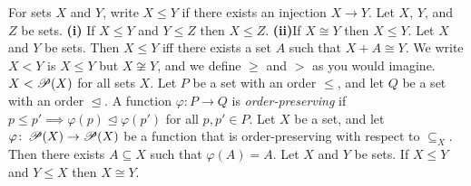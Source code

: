  For sets $X$ and $Y$, write $X \leq Y$ if there exists an injection $X \to Y$.
 Let $X$, $Y$, and $Z$ be sets. \textbf{(i)} If $X \leq Y$ and $Y \leq Z$ then $X \leq Z$. \textbf{(ii)}If $X \cong Y$ then $X \leq Y$.
 Let $X$ and $Y$ be sets. Then $X \leq Y$ iff there exists a set $A$ such that $X + A \cong Y$.
 We write $X < Y$ is $X \leq Y$ but $X \not \cong Y$, and we define $\geq$ and $>$ as you would imagine.
 $X < \operatorname{\mathscr{P}}(X)$ for all sets $X$.
 Let $P$ be a set with an order $\leq$, and let $Q$ be a set with an order $\trianglelefteq$. A function $\varphi \colon P \to Q$ is \textit{order-preserving} if $p \leq p' \implies \varphi(p) \trianglelefteq \varphi(p')$ for all $p, p' \in P$.
 Let $X$ be a set, and let $\varphi \colon \operatorname{\mathscr{P}}(X) \to \operatorname{\mathscr{P}}(X)$ be a function that is order-preserving with respect to $\subseteq_X$. Then there exists $A \subseteq X$ such that $\varphi(A) = A$.
 Let $X$ and $Y$ be sets. If $X \leq Y$ and $Y \leq X$ then $X \cong Y$.
